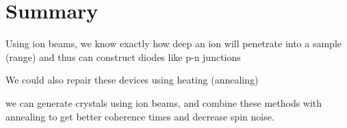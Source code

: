 \section{Summary}
\begin{myitemize}
	\item Using ion beams, we know exactly how deep an ion will penetrate into a sample (range) and thus can construct diodes like p-n junctions
	\item We could also repair these devices using heating (annealing)
	\item we can generate crystals using ion beams, and combine these methods with annealing to get better coherence times and decrease spin noise.
\end{myitemize}
